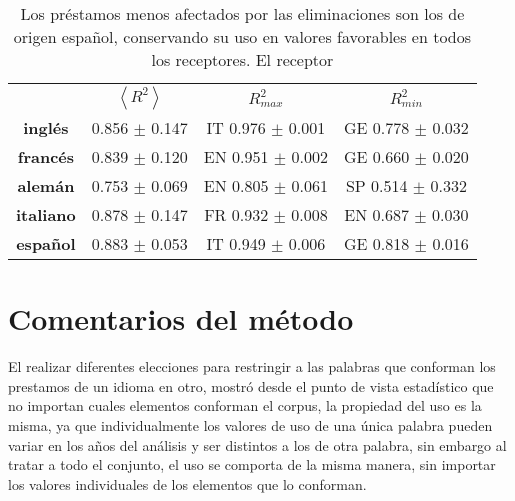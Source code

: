 \begin{table}[h!]
	\centering
	\begin{tabular}{cccc}
		\textbf{} & \textbf{$\left \langle R^{2} \right \rangle$} & \textbf{$R^{2}_{max}$} & \textbf{$R^{2}_{min}$} \\
		\textbf{inglés}   & 0.856 $\pm$ 0.147   &  IT 0.976 $\pm$ 0.001  & GE 0.778 $\pm$ 0.032  \\
		\textbf{francés}  & 0.839 $\pm$ 0.120   &  EN 0.951 $\pm$ 0.002  & GE 0.660 $\pm$ 0.020  \\
		\textbf{alemán}   & 0.753 $\pm$ 0.069   &  EN 0.805 $\pm$ 0.061  & SP 0.514 $\pm$ 0.332  \\
		\textbf{italiano} & 0.878 $\pm$ 0.147   &  FR 0.932 $\pm$ 0.008  & EN 0.687 $\pm$ 0.030  \\
		\textbf{español}  & 0.883 $\pm$ 0.053   &  IT 0.949 $\pm$ 0.006  & GE 0.818 $\pm$ 0.016                                                                
	\end{tabular}
	\caption{Los préstamos menos afectados por las eliminaciones son los de origen español, conservando su uso en valores favorables en todos los receptores. El receptor }
	\label{tab.conservacion}
\end{table}



\section{Comentarios del método}

El realizar diferentes elecciones para restringir a las palabras que conforman los prestamos de un idioma en otro, mostró desde el punto de vista estadístico que no importan cuales elementos conforman el corpus, la propiedad del uso es la misma, ya que individualmente los valores de uso de una única palabra pueden variar en los años del análisis y ser distintos a los de otra palabra, sin embargo al tratar a todo el conjunto, el uso se comporta de la misma  manera, sin importar los valores individuales de los elementos que lo conforman. 



